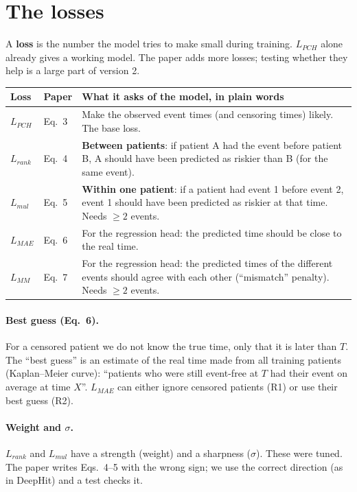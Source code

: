 \documentclass[11pt]{article}
\begin{document}
\section{The losses}
A \textbf{loss} is the number the model tries to make small during training. $L_{PCH}$ alone already
gives a working model. The paper adds more losses; testing whether they help is a large part of
version 2.

\begin{table}[H]
\centering
\begin{tabularx}{\textwidth}{llY}
\toprule
Loss & Paper & What it asks of the model, in plain words \\
\midrule
$L_{PCH}$ & Eq.~3 & Make the observed event times (and censoring times) likely. The base loss. \\
$L_{rank}$ & Eq.~4 & \textbf{Between patients}: if patient A had the event before patient B, A should have
  been predicted as riskier than B (for the same event). \\
$L_{mul}$ & Eq.~5 & \textbf{Within one patient}: if a patient had event 1 before event 2, event 1 should
  have been predicted as riskier at that time. Needs $\geq 2$ events. \\
$L_{MAE}$ & Eq.~6 & For the regression head: the predicted time should be close to the real time. \\
$L_{MM}$ & Eq.~7 & For the regression head: the predicted times of the different events should agree
  with each other (``mismatch'' penalty). Needs $\geq 2$ events. \\
\bottomrule
\end{tabularx}
\end{table}

\paragraph{Best guess (Eq.~6).} For a censored patient we do not know the true time, only that it is
later than $T$. The ``best guess'' is an estimate of the real time made from all training patients
(Kaplan--Meier curve): ``patients who were still event-free at $T$ had their event on average at time
$X$''. $L_{MAE}$ can either ignore censored patients (R1) or use their best guess (R2).

\paragraph{Weight and $\sigma$.} $L_{rank}$ and $L_{mul}$ have a strength (weight) and a sharpness
($\sigma$). These were tuned. The paper writes Eqs.~4--5 with the wrong sign; we use the correct
direction (as in DeepHit) and a test checks it.
\end{document}
